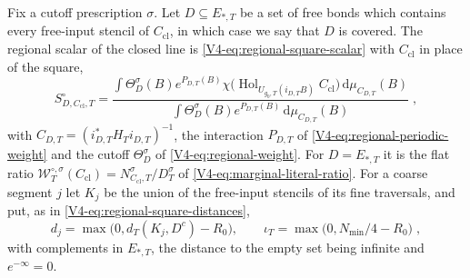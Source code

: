 \documentclass[11pt]{article}
\newcommand{\dd}{\mathrm{d}}
\newcommand{\Hol}{\operatorname{Hol}}
\numberwithin{equation}{section}
\theoremstyle{remark}
\theoremstyle{plain}
\begin{document}
Fix a cutoff prescription $\sigma$. Let $D\subseteq E_{*,T}$ be a set of free bonds which contains every free-input stencil of $C_{\mathrm{cl}}$, in which case we say that $D$ is covered. The regional scalar of the closed line is \eqref{V4-eq:regional-square-scalar} with $C_{\mathrm{cl}}$ in place of the square,
\begin{equation}\label{eq:closed-line-scalar}
    S^{\circ}_{D,C_{\mathrm{cl}},T}=
    \frac{\displaystyle\int\Theta_D^{\sigma}(B)e^{P_{D,T}(B)}
        \chi\bigl(\Hol_{U_{g_0,T}(i_{D,T}B)}C_{\mathrm{cl}}\bigr)\,\dd\mu_{C_{D,T}}(B)}
    {\displaystyle\int\Theta_D^{\sigma}(B)e^{P_{D,T}(B)}\,\dd\mu_{C_{D,T}}(B)}\;,
\end{equation}
with $C_{D,T}=(i_{D,T}^*H_Ti_{D,T})^{-1}$, the interaction $P_{D,T}$ of \eqref{V4-eq:regional-periodic-weight} and the cutoff $\Theta^{\sigma}_D$ of \eqref{V4-eq:regional-weight}. For $D= E_{*,T}$ it is the flat ratio $\mathcal W^{\circ,\sigma}_T(C_{\mathrm{cl}})= N^{\sigma}_{C_{\mathrm{cl}},T}/D^{\sigma}_T$ of \eqref{V4-eq:marginal-literal-ratio}. For a coarse segment $j$ let $K_j$ be the union of the free-input stencils of its fine traversals, and put, as in \eqref{V4-eq:regional-square-distances},
\begin{equation}\label{eq:closed-line-distances}
    d_j=\max\bigl(0,d_T(K_j,D^c)-R_0\bigr),
    \qquad \iota_T=\max\bigl(0,N_{\min}/4-R_0\bigr)\;,
\end{equation}
with complements in $E_{*,T}$, the distance to the empty set being infinite and $e^{-\infty}=0$.
\end{document}
